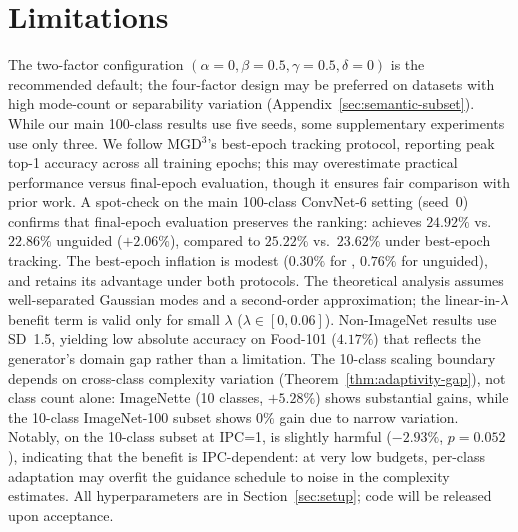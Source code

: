 \FloatBarrier
\section{Limitations}
\label{sec:limitations}

The two-factor configuration $(\alpha{=}0, \beta{=}0.5, \gamma{=}0.5, \delta{=}0)$ is the recommended default; the four-factor design may be preferred on datasets with high mode-count or separability variation (Appendix~\ref{sec:semantic-subset}). While our main 100-class results use five seeds, some supplementary experiments use only three. We follow MGD$^3$'s best-epoch tracking protocol, reporting peak top-1 accuracy across all training epochs; this may overestimate practical performance versus final-epoch evaluation, though it ensures fair comparison with prior work. A spot-check on the main 100-class ConvNet-6 setting (seed~0) confirms that final-epoch evaluation preserves the ranking: \cags{} achieves $24.92\%$ vs.\ $22.86\%$ unguided ($+2.06\%$), compared to $25.22\%$ vs.\ $23.62\%$ under best-epoch tracking. The best-epoch inflation is modest ($0.30\%$ for \cags{}, $0.76\%$ for unguided), and \cags{} retains its advantage under both protocols. The theoretical analysis assumes well-separated Gaussian modes and a second-order approximation; the linear-in-$\lambda$ benefit term is valid only for small $\lambda$ ($\lambda \in [0, 0.06]$). Non-ImageNet results use SD~1.5, yielding low absolute accuracy on Food-101 ($4.17\%$) that reflects the generator's domain gap rather than a \cags{} limitation. The 10-class scaling boundary depends on cross-class complexity variation (Theorem~\ref{thm:adaptivity-gap}), not class count alone: ImageNette (10 classes, $+5.28\%$) shows substantial gains, while the 10-class ImageNet-100 subset shows $0\%$ gain due to narrow variation. Notably, on the 10-class subset at IPC=1, \cags{} is slightly harmful ($-2.93\%$, $p{=}0.052$), indicating that the benefit is IPC-dependent: at very low budgets, per-class adaptation may overfit the guidance schedule to noise in the complexity estimates. All hyperparameters are in Section~\ref{sec:setup}; code will be released upon acceptance.
